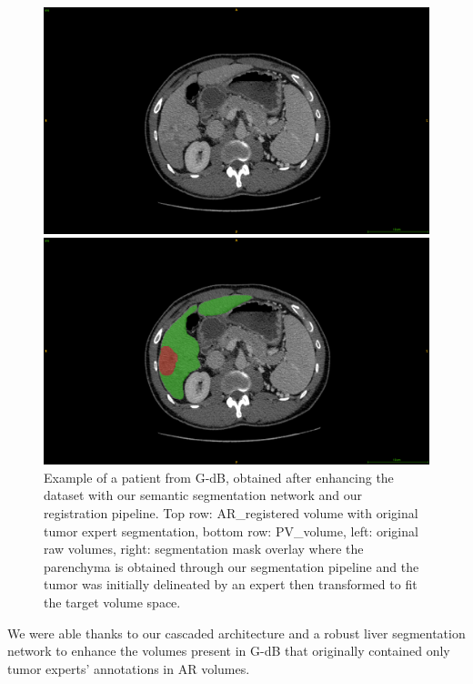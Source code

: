 \documentclass[]{article}
\newcommand{\lmttfont}[1]{{\fontfamily{lmtt}\selectfont #1}}
\begin{document}
\begin{figure}[ht!]
\vspace{0.8cm}
\begin{minipage}{0.45\linewidth}
\includegraphics[width=0.9\linewidth]{./images/GDB/GDB_Pat77_slice261_raw_PV}
\end{minipage}
\hspace{0.3cm}
\begin{minipage}{0.45\linewidth}
\includegraphics[width=0.9\linewidth]{./images/GDB/GDB_Pat77_slice261_PV_liverTumorPred}
\end{minipage}
\caption{Example of a patient from \lmttfont{G-dB}, obtained after enhancing the dataset with our semantic segmentation network and our registration pipeline. Top row: AR\_registered volume with original tumor expert segmentation, bottom row: PV\_volume, left: original raw volumes, right: segmentation mask overlay where the parenchyma is obtained through our segmentation pipeline and the tumor was initially delineated by an expert then transformed to fit the target volume space.}
\label{fig:gDbRegisteredPatient}
\end{figure}


We were able thanks to our cascaded architecture and a robust liver
segmentation network to enhance the volumes present in \lmttfont{G-dB} that
originally contained only tumor experts' annotations in AR volumes.
\end{document}
